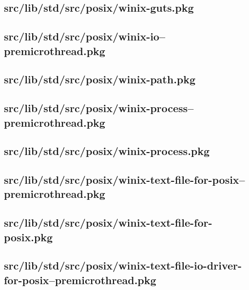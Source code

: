 \subsection{src/lib/std/src/posix/winix-guts.pkg}


\subsection{src/lib/std/src/posix/winix-io--premicrothread.pkg}


\subsection{src/lib/std/src/posix/winix-path.pkg}


\subsection{src/lib/std/src/posix/winix-process--premicrothread.pkg}


\subsection{src/lib/std/src/posix/winix-process.pkg}


\subsection{src/lib/std/src/posix/winix-text-file-for-posix--premicrothread.pkg}


\subsection{src/lib/std/src/posix/winix-text-file-for-posix.pkg}


\subsection{src/lib/std/src/posix/winix-text-file-io-driver-for-posix--premicrothread.pkg}


